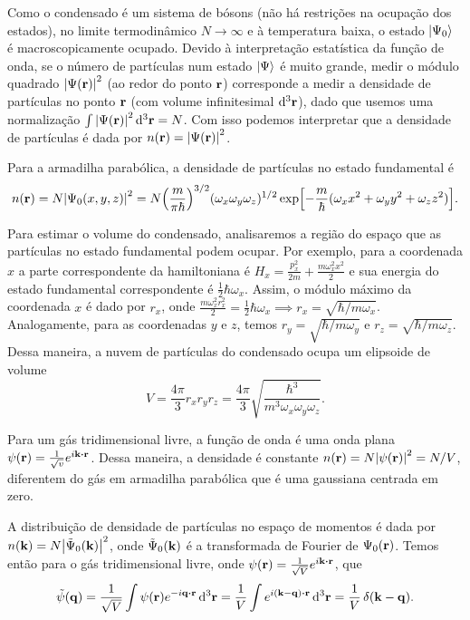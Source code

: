 \documentclass[a4paper,10pt]{article}
\begin{document}
\n

Como o condensado é um sistema de bósons (não há restrições na ocupação dos estados), no limite termodinâmico $N \to \infty$ e à temperatura baixa, o estado $\ket{\Psi_0}$ é macroscopicamente ocupado. Devido à interpretação estatística da função de onda, se o número de partículas num estado $\ket{\Psi}$ é muito grande, medir o módulo quadrado $\abs{\Psi(\vb{r})}^2$ (ao redor do ponto $\vb{r}$) corresponde a medir a densidade de partículas no ponto $\vb{r}$ (com volume infinitesimal $\dd[3]{\vb{r}}$), dado que usemos uma normalização $\int \abs{\Psi(\vb{r})}^2 \dd[3]{\vb{r}} = N$. Com isso podemos interpretar que a densidade de partículas é dada por $n(\vb{r}) = \abs{\Psi(\vb{r})}^2$.

\n

Para a armadilha parabólica, a densidade de partículas no estado fundamental é
$$
n(\vb{r}) = N \abs{\Psi_0(x,y,z)}^2 =
N\qty(\frac{m}{\pi\hbar})^{3/2}
(\omega_x \omega_y \omega_z)^{1/2}
\exp[-\frac{m}{\hbar} (\omega_x x^2 + \omega_y y^2 + \omega_z z^2)].
$$

\n

Para estimar o volume do condensado, analisaremos a região do espaço que as partículas no estado fundamental podem ocupar. Por exemplo, para a coordenada $x$ a parte correspondente da hamiltoniana é $H_x = \frac{p_x^2}{2m} + \frac{m\omega_x^2 x^2}{2}$ e sua energia do estado fundamental correspondente é $\frac{1}{2} \hbar \omega_x$. Assim, o módulo máximo da coordenada $x$ é dado por $r_x$, onde $\frac{m\omega_x^2 r_x^2}{2} = \frac{1}{2} \hbar \omega_x \implies r_x = \sqrt{\hbar/m\omega_x}$. Analogamente, para as coordenadas $y$ e $z$, temos $r_y = \sqrt{\hbar/m\omega_y}$ e $r_z = \sqrt{\hbar/m\omega_z}$. Dessa maneira, a nuvem de partículas do condensado ocupa um elipsoide de volume
$$
V = \frac{4\pi}{3} r_x r_y r_z = \frac{4\pi}{3} \sqrt{\frac{\hbar^3}{m^3\omega_x\omega_y\omega_z}}.
$$

\n

Para um gás tridimensional livre, a função de onda é uma onda plana $\psi(\r) = \frac{1}{\sqrt{v}} e^{i \k \vdot \r}$. Dessa maneira, a densidade é constante $n(\vb{r}) = N \abs{\psi(\vb{r})}^2 = N/V$, diferentem do gás em armadilha parabólica que é uma gaussiana centrada em zero.

\n

A distribuição de densidade de partículas no espaço de momentos é dada por $n(\vb{k}) = N\abs{\tilde{\Psi}_0(\vb{k})}^2$, onde $\tilde{\Psi}_0(\vb{k})$ é a transformada de Fourier de $\Psi_0(\vb{r})$. Temos então para o gás tridimensional livre, onde $\psi(\r) = \frac{1}{\sqrt{V}} e^{i \k \vdot \r}$, que
$$
\tilde{\psi}(\q) = \frac{1}{\sqrt{V}} \int \psi(\r) e^{-i\q\vdot\r} \dd[3]{\r} = \frac{1}{V} \int e^{i (\k-\q)\vdot\r} \dd[3
]{\r} = \frac{1}{V} \, \delta(\k-\q).
$$
\end{document}
